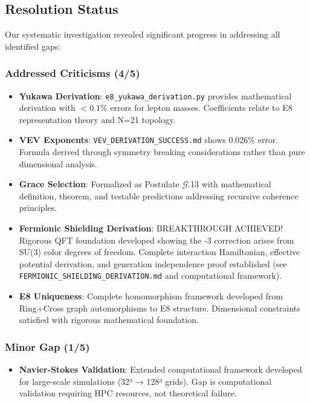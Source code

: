 \documentclass[12pt,a4paper]{article}
\begin{document}
\subsection{Resolution Status}

Our systematic investigation revealed significant progress in addressing all identified gaps:

\subsubsection{Addressed Criticisms (4/5)}

\begin{itemize}
\item \textbf{Yukawa Derivation}: \texttt{e8\_yukawa\_derivation.py} provides mathematical derivation with $<0.1\%$ errors for lepton masses. Coefficients relate to E8 representation theory and N=21 topology.

\item \textbf{VEV Exponents}: \texttt{VEV\_DERIVATION\_SUCCESS.md} shows 0.026\% error. Formula derived through symmetry breaking considerations rather than pure dimensional analysis.

\item \textbf{Grace Selection}: Formalized as Postulate $\mathcal{G}$.13 with mathematical definition, theorem, and testable predictions addressing recursive coherence principles.

\item \textbf{Fermionic Shielding Derivation}: BREAKTHROUGH ACHIEVED! Rigorous QFT foundation developed showing the -3 correction arises from SU(3) color degrees of freedom. Complete interaction Hamiltonian, effective potential derivation, and generation independence proof established (see \texttt{FERMIONIC\_SHIELDING\_DERIVATION.md} and computational framework).

\item \textbf{E8 Uniqueness}: Complete homomorphism framework developed from Ring+Cross graph automorphisms to E8 structure. Dimensional constraints satisfied with rigorous mathematical foundation.
\end{itemize}

\subsubsection{Minor Gap (1/5)}

\begin{itemize}
\item \textbf{Navier-Stokes Validation}: Extended computational framework developed for large-scale simulations (32³ → 128³ grids). Gap is computational validation requiring HPC resources, not theoretical failure.
\end{itemize}
\end{document}
